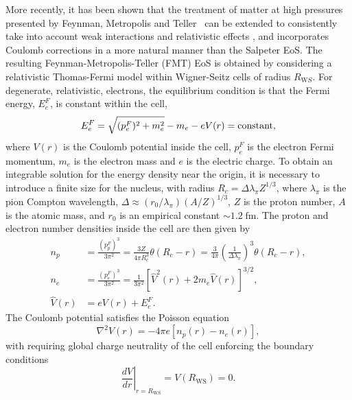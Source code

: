 More recently, it has been shown that the treatment of matter at high pressures presented by Feynman, Metropolis and Teller~\cite{Feynman:1949zz_Equationsstateelements} can be extended to consistently take into account weak interactions and relativistic effects \cite{Rotondo:2009cr_RelativisticThomasFermitreatment,Rotondo:2011zz_RelativisticFeynmanMetropolisTellertheory}, and incorporates Coulomb corrections in a more natural manner than the Salpeter EoS. The resulting Feynman-Metropolis-Teller (FMT) EoS is obtained by considering a relativistic Thomas-Fermi model within Wigner-Seitz cells of radius $R_{\mathrm WS}$. 
For degenerate, relativistic, electrons, the equilibrium condition is that the Fermi energy, $E_e^F$, is constant within the cell,
\begin{equation}\label{eq:rel_equil}
E_e^F=\sqrt{(p_e^F)^2+m_e^2}-m_e-eV(r) = \rm{constant},
\end{equation}
where $V(r)$ is the Coulomb potential inside the cell, $p_e^F$ is the electron Fermi momentum, $m_e$ is the electron mass and $e$ is the electric charge. To obtain an integrable solution for the energy density near the origin, it is necessary to introduce a finite size for the nucleus, with radius $ R_c = \Delta\lambda_{\pi} Z^{1/3}$, 
where $\lambda_\pi$ is the pion Compton wavelength, $\Delta \approx (r_0 /\lambda_\pi)(A/Z)^{1/3}$, $Z$ is the proton number, $A$ is the atomic mass, and $r_0$ is an empirical constant $\sim 1.2\;\text{fm}$. The proton and electron number densities inside the cell are then given by
\begin{align}
    n_p &=  \frac{(p^F_p)^3}{3\pi^2} =\frac{3Z}{4\pi R_c^3}\theta( R_c - r ) = \frac{3}{4\pi} \left( \frac{1}{\Delta \lambda_\pi} \right)^3 \theta(R_c -r), \label{eq:prot_dens_FMT}\\
    n_e &= \frac{(p^F_e)^3}{3\pi^2} = \frac{1}{3\pi^2}\left[ \hat{V}^2(r) + 2m_e \hat{V}(r)\right]^{3/2},\label{eq:elec_dens_FMT}\\
    \hat{V}(r) &= eV(r) + E_e^F. \label{eq:vhat}
\end{align}
The Coulomb potential satisfies the Poisson equation 
\begin{equation}
    \nabla^2 V(r) = -4\pi e[n_p(r) - n_e(r)],
    \label{eq:poisson_WS_cell}
\end{equation} 
with requiring global charge neutrality of the cell enforcing the boundary conditions
\begin{equation}
    \left.\frac{dV}{dr}\right|_{r = R_\mathrm{WS}} = V(R_\mathrm{WS}) = 0.
\end{equation}
